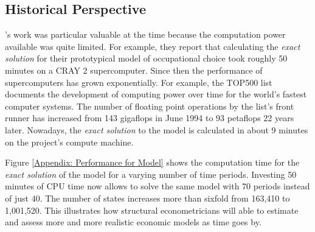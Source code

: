\subsection{Historical Perspective}\label{Appendix: Historical Perspective}
\citet{Keane.1994}'s work was particular valuable at the time because the computation power available was quite limited. For example, they report that calculating the \textit{exact solution} for their prototypical model of occupational choice took roughly 50 minutes on a CRAY 2 supercomputer. Since then the performance of supercomputers has grown exponentially. For example, the TOP500 \citep{TOP500.2017} list documents the development of computing power over time for the world's fastest computer systems. The number of floating point operations by the list's front runner has increased from 143 gigaflops in June 1994 to 93 petaflops 22 years later. Nowadays, the \textit{exact solution} to the model is calculated in about 9 minutes on the project's compute machine.
%

%
Figure \ref{Appendix: Performance for Model} shows the computation time for the \textit{exact solution} of the model for a varying number of time periods. Investing 50 minutes of CPU time now allows to solve the same model with 70 periods instead of just 40. The number of states increases more than sixfold from 163,410 to 1,001,520. This illustrates how structural econometricians will able to estimate and assess more and more realistic economic models as time goes by.
